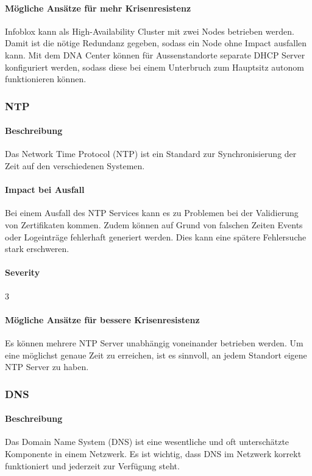 \paragraph{Mögliche Ansätze für mehr Krisenresistenz}

Infoblox kann als High-Availability Cluster mit zwei Nodes betrieben werden. Damit ist die nötige Redundanz gegeben, sodass ein Node ohne Impact ausfallen kann. Mit dem DNA Center können für Aussenstandorte separate DHCP Server konfiguriert werden, sodass diese bei einem Unterbruch zum Hauptsitz autonom funktionieren können.


\subsubsection{NTP}
\paragraph{Beschreibung}
Das Network Time Protocol (NTP) ist ein Standard zur Synchronisierung der Zeit auf den verschiedenen Systemen.

\paragraph{Impact bei Ausfall}
Bei einem Ausfall des NTP Services kann es zu Problemen bei der Validierung von Zertifikaten kommen. Zudem können auf Grund von falschen Zeiten Events oder Logeinträge fehlerhaft generiert werden. Dies kann eine spätere Fehlersuche stark erschweren.

\paragraph{Severity} 3

\paragraph{Mögliche Ansätze für bessere Krisenresistenz}
Es können mehrere NTP Server unabhängig voneinander betrieben werden. Um eine möglichst genaue Zeit zu erreichen, ist es sinnvoll, an jedem Standort eigene NTP Server zu haben.

\subsubsection{DNS}
\paragraph{Beschreibung}
Das Domain Name System (DNS) ist eine wesentliche und oft unterschätzte Komponente in einem Netzwerk. Es ist wichtig, dass DNS im Netzwerk korrekt funktioniert und jederzeit zur Verfügung steht.

